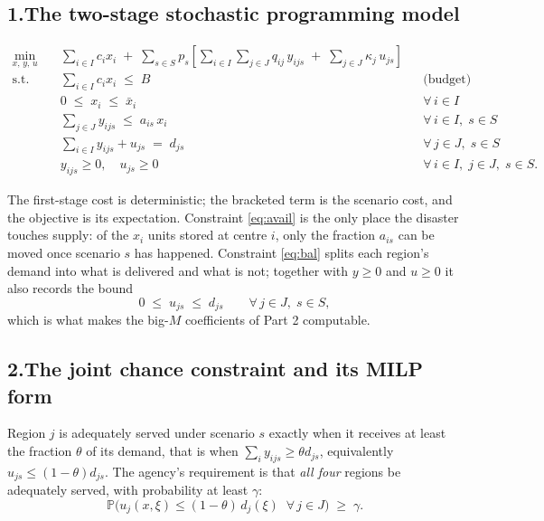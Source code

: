 \documentclass[11pt]{article}
\DeclareMathOperator*{\minimize}{min}
\theoremstyle{definition}\newtheorem*{definition}{Definition}
\theoremstyle{definition}
\begin{document}
\subsection*{1.\quad The two-stage stochastic programming model}

\begin{align}
  \minimize_{x,\,y,\,u} \quad
    & \sum_{i \in I} c_i x_i
      \;+\; \sum_{s \in S} p_s \left[
        \sum_{i \in I}\sum_{j \in J} q_{ij}\, y_{ijs}
        \;+\; \sum_{j \in J} \kappa_j\, u_{js} \right]
      \label{eq:p1obj}\\
  \text{s.t.}\quad
    & \sum_{i \in I} c_i x_i \;\le\; B
      && \text{(budget)} \label{eq:budget}\\
    & 0 \;\le\; x_i \;\le\; \bar{x}_i
      && \forall\, i \in I \label{eq:cap}\\
    & \sum_{j \in J} y_{ijs} \;\le\; a_{is}\, x_i
      && \forall\, i \in I,\; s \in S \label{eq:avail}\\
    & \sum_{i \in I} y_{ijs} + u_{js} \;=\; d_{js}
      && \forall\, j \in J,\; s \in S \label{eq:bal}\\
    & y_{ijs} \ge 0,\quad u_{js} \ge 0
      && \forall\, i \in I,\; j \in J,\; s \in S .
\end{align}

The first-stage cost is deterministic; the bracketed term is the
scenario cost, and the objective is its expectation. Constraint
\eqref{eq:avail} is the only place the disaster touches supply: of the
$x_i$ units stored at centre $i$, only the fraction $a_{is}$ can be moved
once scenario $s$ has happened. Constraint \eqref{eq:bal} splits each
region's demand into what is delivered and what is not; together with
$y \ge 0$ and $u \ge 0$ it also records the bound
\begin{equation}
  0 \;\le\; u_{js} \;\le\; d_{js}
  \qquad \forall\, j \in J,\; s \in S,
  \label{eq:ubound}
\end{equation}
which is what makes the big-$M$ coefficients of Part 2 computable.

\subsection*{2.\quad The joint chance constraint and its MILP form}

Region $j$ is adequately served under scenario $s$ exactly when it
receives at least the fraction $\theta$ of its demand, that is when
$\sum_i y_{ijs} \ge \theta d_{js}$, equivalently
$u_{js} \le (1-\theta) d_{js}$. The agency's requirement is that
\emph{all four} regions be adequately served, with probability at least
$\gamma$:
\begin{equation}
  \mathbb{P}\Big(
    u_{j}(x,\xi) \le (1-\theta)\, d_{j}(\xi)
    \;\; \forall\, j \in J \Big) \;\ge\; \gamma .
  \label{eq:joint}
\end{equation}
\end{document}
